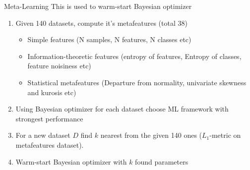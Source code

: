 \documentclass[12pt]{beamer}
\begin{document}
\begin{frame}{Meta-Learning}
This is used to warm-start Bayesian optimizer
\begin{enumerate}
    \item Given 140 datasets, compute it's metafeatures (total 38) \pause
    \begin{itemize}
        \item Simple features (N samples, N features, N classes etc) \pause
        \item Information-theoretic features (entropy of features, Entropy of classes, feature noisiness etc) \pause
        \item Statistical metafeatures (Departure from normality, univariate skewness and kurosis etc) \pause
    \end{itemize}
    \item Using Bayesian optimizer for each dataset  choose ML framework with strongest performance \pause
    \item For a new dataset $D$ find $k$ nearest from the given 140 ones ($L_1$-metric on metafeatures dataset). \pause
    \item Warm-start Bayesian optimizer with $k$ found parameters
\end{enumerate}

\end{frame}
\end{document}
